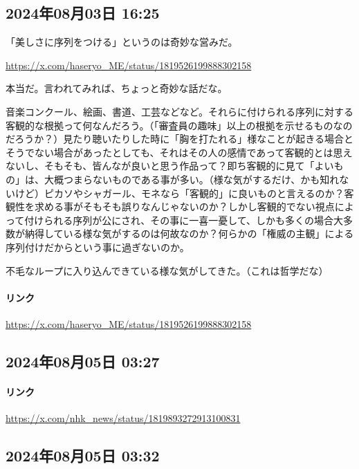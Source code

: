 \subsection*{2024年08月03日 16:25}

「美しさに序列をつける」というのは奇妙な営みだ。

\url{https://x.com/haseryo_ME/status/1819526199888302158}

本当だ。言われてみれば、ちょっと奇妙な話だな。

音楽コンクール、絵画、書道、工芸などなど。それらに付けられる序列に対する客観的な根拠って何なんだろう。（「審査員の趣味」以上の根拠を示せるものなのだろうか？）見たり聴いたりした時に「胸を打たれる」様なことが起きる場合とそうでない場合があったとしても、それはその人の感情であって客観的とは思えないし、そもそも、皆んなが良いと思う作品って？即ち客観的に見て「よいもの」は、大概つまらないものである事が多い。（様な気がするだけ、かも知れないけど）ピカソやシャガール、モネなら「客観的」に良いものと言えるのか？客観性を求める事がそもそも誤りなんじゃないのか？しかし客観的でない視点によって付けられる序列が公にされ、その事に一喜一憂して、しかも多くの場合大多数が納得している様な気がするのは何故なのか？何らかの「権威の主観」による序列付けだからという事に過ぎないのか。

不毛なループに入り込んできている様な気がしてきた。（これは哲学だな）

\paragraph{リンク}
\url{https://x.com/haseryo_ME/status/1819526199888302158}

\subsection*{2024年08月05日 03:27}

\paragraph{リンク}
\url{https://x.com/nhk_news/status/1819893272913100831}

\subsection*{2024年08月05日 03:32}

